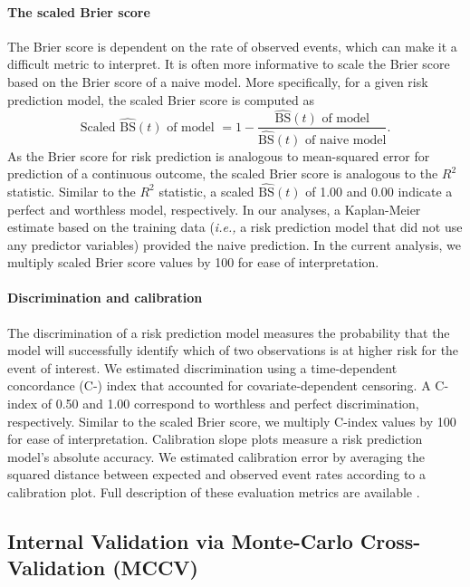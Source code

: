 \documentclass{article}
\begin{document}
\paragraph{The scaled Brier score}

The Brier score is dependent on the rate of observed events, which can
make it a difficult metric to interpret. It is often more informative to
scale the Brier score based on the Brier score of a naive model. More
specifically, for a given risk prediction model, the scaled Brier score
is computed as
\[\textrm{Scaled } \widehat{\textrm{BS}}(t)\textrm{ of model } = 1 - \frac{\widehat{\textrm{BS}}(t)\textrm{ of model}}{\widehat{\textrm{BS}}(t)\textrm{ of naive model}}.\]
As the Brier score for risk prediction is analogous to mean-squared
error for prediction of a continuous outcome, the scaled Brier score is
analogous to the \(R^2\) statistic. Similar to the \(R^2\) statistic, a
scaled \(\widehat{\textrm{BS}}(t)\) of 1.00 and 0.00 indicate a perfect
and worthless model, respectively. In our analyses, a Kaplan-Meier
estimate based on the training data (\textit{i.e., } a risk prediction
model that did not use any predictor variables) provided the naive
prediction. In the current analysis, we multiply scaled Brier score
values by 100 for ease of interpretation.

\paragraph{Discrimination and calibration}

The discrimination of a risk prediction model measures the probability
that the model will successfully identify which of two observations is
at higher risk for the event of interest. We estimated discrimination
using a time-dependent concordance (C-) index that accounted for
covariate-dependent censoring. A C-index of 0.50 and 1.00 correspond to
worthless and perfect discrimination, respectively. Similar to the
scaled Brier score, we multiply C-index values by 100 for ease of
interpretation. Calibration slope plots measure a risk prediction
model's absolute accuracy. We estimated calibration error by averaging
the squared distance between expected and observed event rates according
to a calibration plot. Full description of these evaluation metrics are
available \cite{gerds2014calibration, gerds2013estimating}.

\hypertarget{internal-validation-via-monte-carlo-cross-validation-mccv}{%
\subsection{Internal Validation via Monte-Carlo Cross-Validation
(MCCV)}\label{internal-validation-via-monte-carlo-cross-validation-mccv}}
\end{document}
